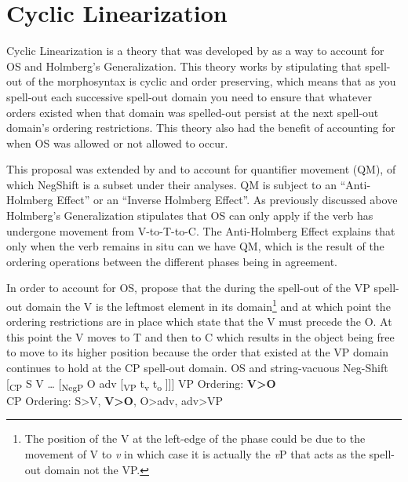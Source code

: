 \documentclass[12pt, letterpaper]{article}
\begin{document}
\section{Cyclic Linearization} \label{sec:CL}

Cyclic Linearization is a theory that was developed by \cite{foxCyclicLinearizationSyntactic2005} as a way to account for OS and Holmberg's Generalization. This theory works by stipulating that spell-out of the morphosyntax is cyclic and order preserving, which means that as you spell-out each successive spell-out domain you need to ensure that whatever orders existed when that domain was spelled-out persist at the next spell-out domain's ordering restrictions. This theory also had the benefit of accounting for when OS was allowed or not allowed to occur. 

This proposal was extended by \citet{foxCyclicLinearizationSyntactic2005} and \citet{engelsMicrovariationObjectPositions2011,engelsScandinavianNegativeIndefinites2012} to account for quantifier movement (QM), of which NegShift is a subset under their analyses. QM is subject to an ``Anti-Holmberg Effect'' or an ``Inverse Holmberg Effect''. As previously discussed above Holmberg's Generalization stipulates that OS can only apply if the verb has undergone movement from V-to-T-to-C. The Anti-Holmberg Effect explains that only when the verb remains in situ can we have QM, which is the result of the ordering operations between the different phases being in agreement. 

In order to account for OS, \citeauthor{foxCyclicLinearizationSyntactic2005} propose that the during the spell-out of the VP spell-out domain the V is the leftmost element in its domain\footnote{The position of the V at the left-edge of the phase could be due to the movement of V to \textit{v} in which case it is actually the \textit{v}P that acts as the spell-out domain not the VP.} and at which point the ordering restrictions are in place which state that the V must precede the O. At this point the V moves to T and then to C which results in the object being free to move to its higher position because the order that existed at the VP domain continues to hold at the CP spell-out domain. 
\ea OS and string-vacuous Neg-Shift
\vspace{6pt}
 	\ea {}[\textsubscript{CP} S V … [\textsubscript{NegP} O adv [\textsubscript{VP} t\textsubscript{v} t\textsubscript{o} ]]]
	\vspace{6pt}
	\ex VP Ordering: \textbf{V>O}\\
		CP Ordering: S>V, \textbf{V>O}, O>adv, adv>VP
	\z
\z
\end{document}
